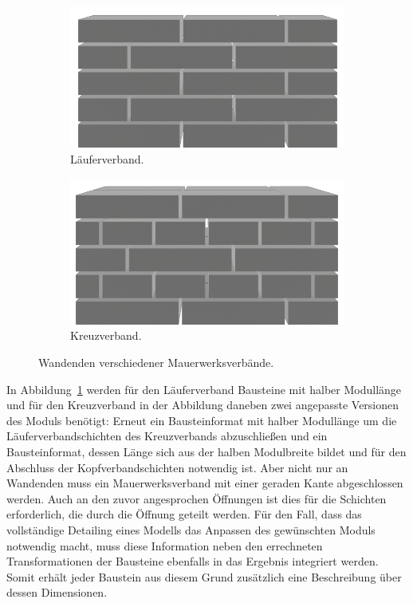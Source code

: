 \begin{figure}[htb]
    \begin{subfigure}[b]{0.49\columnwidth}
      \includegraphics[width=\columnwidth]{fig/concept_wall_endings_1.png}
      \caption{Läuferverband.}\label{fig:concept:lauferverband_ending}
    \end{subfigure}
    \hfil
    \begin{subfigure}[b]{0.49\columnwidth}
      \includegraphics[width=\columnwidth]{fig/concept_wall_endings_2.png}
      \caption{Kreuzverband.}\label{fig:concept:kreuzverband_ending}
    \end{subfigure}
  \caption{Wandenden verschiedener Mauerwerksverbände.}
\end{figure}

In Abbildung~\ref{fig:concept:lauferverband_ending} werden für den Läuferverband Bausteine mit halber Modullänge und für den Kreuzverband in der Abbildung daneben zwei angepasste Versionen des Moduls benötigt:
Erneut ein Bausteinformat mit halber Modullänge um die Läuferverbandschichten des Kreuzverbands abzuschließen und ein Bausteinformat, dessen Länge sich aus der halben Modulbreite bildet und für den Abschluss der Kopfverbandschichten notwendig ist.
Aber nicht nur an Wandenden muss ein Mauerwerksverband mit einer geraden Kante abgeschlossen werden.
Auch an den zuvor angesprochen Öffnungen ist dies für die Schichten erforderlich, die durch die Öffnung geteilt werden.
Für den Fall, dass das vollständige Detailing eines Modells das Anpassen des gewünschten Moduls notwendig macht, muss diese Information neben den errechneten Transformationen der Bausteine ebenfalls in das Ergebnis integriert werden.
Somit erhält jeder Baustein aus diesem Grund zusätzlich eine Beschreibung über dessen Dimensionen.


